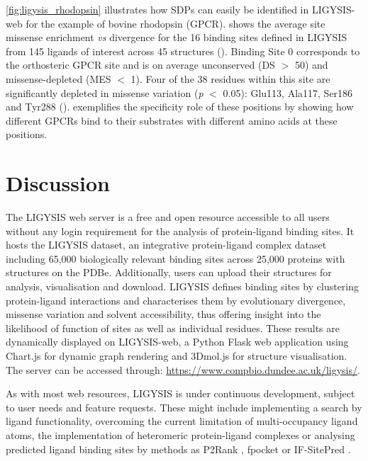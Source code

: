 \autoref{fig:ligysis_rhodopsin} illustrates how SDPs can easily be identified in LIGYSIS-web for the example of bovine rhodopsin (GPCR).  shows the average site missense enrichment \textit{vs} divergence for the 16 binding sites defined in LIGYSIS from 145 ligands of interest across 45 structures (). Binding Site 0 corresponds to the orthosteric GPCR site and is on average unconserved (DS $>$ 50) and missense-depleted (MES $<$ 1). Four of the 38 residues within this site are significantly depleted in missense variation (\textit{p} $<$ 0.05): Glu113, Ala117, Ser186 and Tyr288 ().  exemplifies the specificity role of these positions by showing how different GPCRs bind to their substrates with different amino acids at these positions.

\section{Discussion}

The LIGYSIS web server is a free and open resource accessible to all users without any login requirement for the analysis of protein-ligand binding sites. It hosts the LIGYSIS dataset, an integrative protein-ligand complex dataset including 65,000 biologically relevant binding sites across 25,000 proteins with structures on the PDBe. Additionally, users can upload their structures for analysis, visualisation and download. LIGYSIS defines binding sites by clustering protein-ligand interactions and characterises them by evolutionary divergence, missense variation and solvent accessibility, thus offering insight into the likelihood of function of sites as well as individual residues. These results are dynamically displayed on LIGYSIS-web, a Python Flask web application using Chart.js for dynamic graph rendering and 3Dmol.js for structure visualisation. The server can be accessed through: \url{https://www.compbio.dundee.ac.uk/ligysis/}.

As with most web resources, LIGYSIS is under continuous development, subject to user needs and feature requests. These might include implementing a search by ligand functionality, overcoming the current limitation of multi-occupancy ligand atoms, the implementation of heteromeric protein-ligand complexes or analysing predicted ligand binding sites by methods as P2Rank \cite{KRIVAK_2018_P2RANK}, fpocket \cite{GUILLOUX_2009_FPOCKET} or IF-SitePred \cite{CARBERY_2024_IFSP}.
